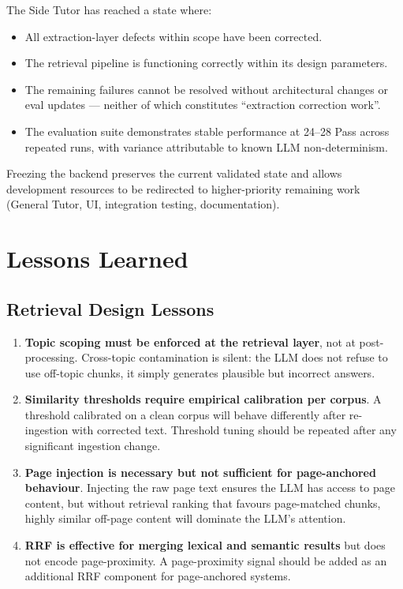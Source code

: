\documentclass[12pt, a4paper]{report}
\begin{document}
The Side Tutor has reached a state where:
\begin{itemize}[noitemsep]
  \item All extraction-layer defects within scope have been corrected.
  \item The retrieval pipeline is functioning correctly within its design
        parameters.
  \item The remaining failures cannot be resolved without architectural
        changes or eval updates — neither of which constitutes ``extraction
        correction work''.
  \item The evaluation suite demonstrates stable performance at 24--28 Pass
        across repeated runs, with variance attributable to known LLM
        non-determinism.
\end{itemize}

Freezing the backend preserves the current validated state and allows
development resources to be redirected to higher-priority remaining work
(General Tutor, UI, integration testing, documentation).


\chapter{Lessons Learned}

\section{Retrieval Design Lessons}

\begin{enumerate}
  \item \textbf{Topic scoping must be enforced at the retrieval layer}, not
        at post-processing. Cross-topic contamination is silent: the LLM does
        not refuse to use off-topic chunks, it simply generates plausible but
        incorrect answers.

  \item \textbf{Similarity thresholds require empirical calibration per corpus}.
        A threshold calibrated on a clean corpus will behave differently after
        re-ingestion with corrected text. Threshold tuning should be repeated
        after any significant ingestion change.

  \item \textbf{Page injection is necessary but not sufficient for page-anchored
        behaviour}. Injecting the raw page text ensures the LLM has access to
        page content, but without retrieval ranking that favours page-matched
        chunks, highly similar off-page content will dominate the LLM's
        attention.

  \item \textbf{RRF is effective for merging lexical and semantic results} but
        does not encode page-proximity. A page-proximity signal should be added
        as an additional RRF component for page-anchored systems.
\end{enumerate}
\end{document}
